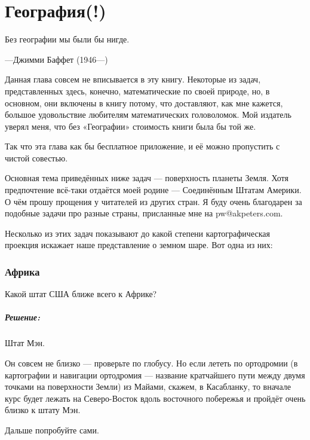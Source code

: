 \chapter*{География(!)}

\setlength{\epigraphwidth}{.45\textwidth}
\epigraph{Без географии мы были бы нигде.}{---Джимми Баффет (1946---)} 

Данная глава совсем не вписывается в эту книгу.
Некоторые из задач, представленных здесь, конечно, математические по своей природе, %
но, в основном, они включены в книгу потому, что доставляют, как мне кажется, большое удовольствие любителям математических головоломок.
Мой издатель уверял меня, что без «Географии» стоимость книги была бы той же.

Так что эта глава как бы бесплатное приложение, и её можно пропустить с чистой совестью.

Основная тема приведённых ниже задач --- поверхность планеты Земля.
Хотя предпочтение всё-таки отдаётся моей родине --- Соединённым Штатам Америки. 
О чём прошу прощения у читателей из других стран.
Я буду очень благодарен за подобные задачи про разные страны, присланные мне на pw@akpeters.com.

Несколько из этих задач показывают до какой степени %
картографическая проекция %
искажает наше представление о земном шаре. %
Вот одна из них: 

\subsection*{Африка}

Какой штат США ближе всего к Африке? 

\paragraph{Решение:} Штат Мэн.\heart
  
Он совсем не близко --- проверьте по глобусу.
Но если лететь по ортодромии (в картографии и навигации ортодромия --- название кратчайшего пути между двумя точками на поверхности Земли) из Майами, скажем, в Касабланку, то вначале курс %
будет лежать на Северо-Восток вдоль восточного побережья и пройдёт очень близко к штату Мэн.

\medskip

Дальше попробуйте сами.

